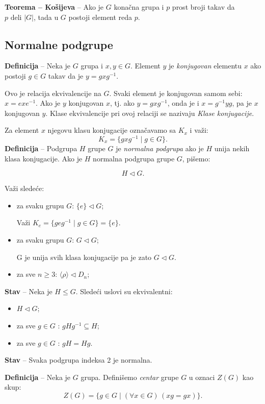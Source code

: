 \documentclass[a4paper,12pt]{article}
\newcommand{\f}[1]{\(#1\)}
\begin{document}
\textbf{Teorema -- Košijeva} -- Ako je \f{G} konačna grupa i \f{p} prost broji takav da
\f{p \text{ deli } |G|}, tada u \f{G} postoji element reda \f{p}.


\subsection{Normalne podgrupe}
\textbf{Definicija} -- Neka je \f{G} grupa i \f{x, y \in G}. Element \f{y} je \emph{konjugovan} 
elementu \f{x} ako postoji \f{g \in G} takav da je \f{y = g x g^{-1}}.

Ovo je relacija ekvivalencije na \f{G}. 
Svaki element je konjugovan samom sebi: \f{x = e x e^{-1}}.
Ako je \f{y} konjugovan \f{x}, tj. ako \f{y = gxg^{-1}}, onda je i \f{x = g^{-1}yg}, pa je \f{x} konjugovan \f{y}.
Klase ekvivalencije pri ovoj relaciji se nazivaju \emph{Klase konjugacije}.

Za element \f{x} njegovu klasu konjugacije označavamo sa \f{K_x} i važi:
\[
  K_x = \{gxg^{-1} \mid g \in G\}.
\]
\textbf{Definicija} -- Podgrupa \f{H} grupe \f{G} je \emph{normalna podgrupa} ako je \f{H} unija nekih klasa konjugacije.
Ako je \f{H} normalna podgrupa grupe \f{G}, pišemo:

\[H \triangleleft G. \]

Važi sledeće:
\begin{itemize}
\item za svaku grupu \f{G}: \f{\{e\} \triangleleft G};

Važi \f{K_e = \{geg^{-1} \mid g \in G\} = \{e\}}.
\item za svaku grupu \f{G}: \f{G \triangleleft G};

G je unija svih klasa konjugacije pa je zato \f{G \triangleleft G}.
\item za sve \f{n \geq 3}: \f{ \langle \rho \rangle \triangleleft D_n};
\end{itemize}

\textbf{Stav} -- Neka je \f{H \leq G}. Sledeći uslovi su ekvivalentni:
\begin{itemize}
  \item \f{H \triangleleft G};
  \item za sve \f{g \in G} : \f{gHg^{-1} \subseteq H};
  \item za sve \f{g \in G} : \f{gH = Hg}.
\end{itemize}

\textbf{Stav} -- Svaka podgrupa indeksa 2 je normalna.

\medskip
\textbf{Definicija} -- Neka je \f{G} grupa. Definišemo \emph{centar} grupe \f{G} u oznaci \f{Z(G)} kao skup:
\[
  Z(G) = \{ g \in G \mid (\forall x \in G) \, (xg = gx) \}.
\]
\end{document}
